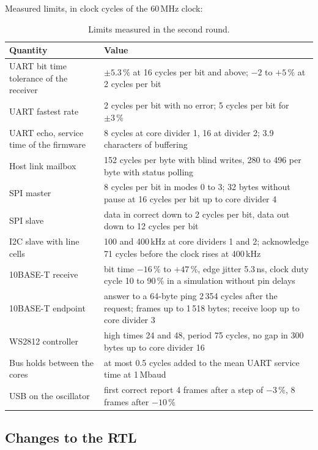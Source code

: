 \documentclass[10pt,a4paper]{article}
\begin{document}
Measured limits, in clock cycles of the 60\,MHz clock:

\begin{table}[H]
\centering\small
\begin{tabularx}{\linewidth}{@{}LL@{}}
\toprule
Quantity & Value \\
\midrule
UART bit time tolerance of the receiver & $\pm 5.3\,\%$ at 16 cycles per bit and above; $-2$ to $+5\,\%$ at 2 cycles per bit \\
UART fastest rate & 2 cycles per bit with no error; 5 cycles per bit for $\pm 3\,\%$ \\
UART echo, service time of the firmware & 8 cycles at core divider 1, 16 at divider 2; 3.9 characters of buffering \\
Host link mailbox & 152 cycles per byte with blind writes, 280 to 496 per byte with status polling \\
SPI master & 8 cycles per bit in modes 0 to 3; 32 bytes without pause at 16 cycles per bit up to core divider 4 \\
SPI slave & data in correct down to 2 cycles per bit, data out down to 12 cycles per bit \\
I2C slave with line cells & 100 and 400\,kHz at core dividers 1 and 2; acknowledge 71 cycles before the clock rises at 400\,kHz \\
10BASE-T receive & bit time $-16\,\%$ to $+47\,\%$, edge jitter 5.3\,ns, clock duty cycle 10 to 90\,\% in a simulation without pin delays \\
10BASE-T endpoint & answer to a 64-byte ping 2\,354 cycles after the request; frames up to 1\,518 bytes; receive loop up to core divider 3 \\
WS2812 controller & high times 24 and 48, period 75 cycles, no gap in 300 bytes up to core divider 16 \\
Bus holds between the cores & at most 0.5 cycles added to the mean UART service time at 1\,Mbaud \\
USB on the oscillator & first correct report 4 frames after a step of $-3\,\%$, 8 frames after $-10\,\%$ \\
\bottomrule
\end{tabularx}
\caption{Limits measured in the second round.}
\end{table}

\subsection{Changes to the RTL}
\end{document}
